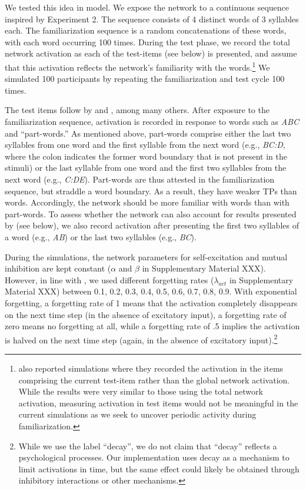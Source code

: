 \documentclass[
]{article}
\begin{document}
We tested this idea in \citep{Endress-TP-Model} model. We expose the
network to a continuous sequence inspired by \citep{Saffran-Science}
Experiment 2. The sequence consists of 4 distinct words of 3 syllables
each. The familiarization sequence is a random concatenations of these
words, with each word occurring 100 times. During the test phase, we
record the total network activation as each of the test-items (see
below) is presented, and assume that this activation reflects the
network's familiarity with the words.\footnote{\citep{Endress-TP-Model}
  also reported simulations where they recorded the activation in the
  items comprising the current test-item rather than the global network
  activation. While the results were very similar to those using the
  total network activation, measuring activation in test items would not
  be meaningful in the current simulations as we seek to uncover
  periodic activity during familiarization.} We simulated 100
participants by repeating the familiarization and test cycle 100 times.

The test items follow by \citep{Saffran-Science} and
\citep{Saffran1996b}, among many others. After exposure to the
familiarization sequence, activation is recorded in response to words
such as \emph{ABC} and ``part-words.'' As mentioned above, part-words
comprise either the last two syllables from one word and the first
syllable from the next word (e.g., \emph{BC:D}, where the colon
indicates the former word boundary that is not present in the stimuli)
or the last syllable from one word and the first two syllables from the
next word (e.g., \emph{C:DE}). Part-words are thus attested in the
familiarization sequence, but straddle a word boundary. As a result,
they have weaker TPs than words. Accordingly, the network should be more
familiar with words than with part-words. To assess whether the network
can also account for results presented by \citep{Flo2022} (see below),
we also record activation after presenting the first two syllables of a
word (e.g., \emph{AB}) or the last two syllables (e.g., \emph{BC}).

During the simulations, the network parameters for self-excitation and
mutual inhibition are kept constant (\(\alpha\) and \(\beta\) in
Supplementary Material XXX). However, in line with
\citep{Endress-TP-Model}, we used different forgetting rates
(\(\lambda_{act}\) in Supplementary Material XXX) between 0.1, 0.2, 0.3,
0.4, 0.5, 0.6, 0.7, 0.8, 0.9. With exponential forgetting, a forgetting
rate of 1 means that the activation completely disappears on the next
time step (in the absence of excitatory input), a forgetting rate of
zero means no forgetting at all, while a forgetting rate of .5 implies
the activation is halved on the next time step (again, in the absence of
excitatory input).\footnote{While we use the label ``decay'', we do not
  claim that ``decay'' reflects a psychological processes. Our
  implementation uses decay as a mechanism to limit activations in time,
  but the same effect could likely be obtained through inhibitory
  interactions or other mechanisms.}
\end{document}
